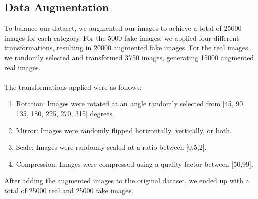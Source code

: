     \subsection{Data Augmentation}
    To balance our dataset, we augmented our images to achieve a total of 25000 images for each category. For the 5000 fake images, we applied four different transformations, resulting in 20000 augmented fake images. For the real images, we randomly selected and transformed 3750 images, generating 15000 augmented real images. \\\\
    The transformations applied were as follows:
    \begin{enumerate}
        \item Rotation: Images were rotated at an angle randomly selected from [45, 90, 135, 180, 225, 270, 315] degrees.
        \item Mirror: Images were randomly flipped horizontally, vertically, or both.
        \item Scale: Images were randomly scaled at a ratio between [0.5,2].
        \item Compression: Images were compressed using a quality factor between [50,99].
    \end{enumerate}
    After adding the augmented images to the original dataset, we ended up with a total of 25000 real and 25000 fake images.

